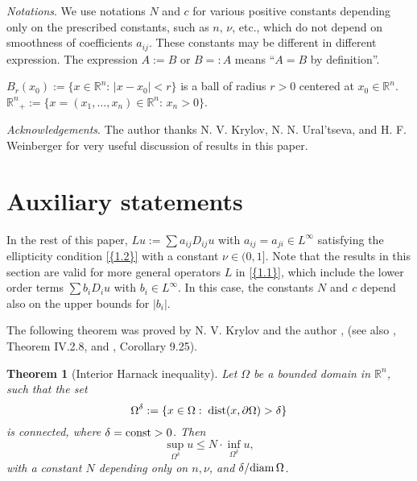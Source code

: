 \documentclass[regno,12pt]{amsart}
\newtheorem{theorem}{Theorem}[section]
\theoremstyle{definition}
\theoremstyle{remark}
\begin{document}
\emph{Notations}.  We use notations $N$ and $c$ for various positive constants depending only on the prescribed constants, such as $n,\,\nu$, etc., which do not depend on smoothness of coefficients $a_{ij}$. These constants may be different in different expression.
The expression $A:=B$ or $B=:A$ means ``$A=B$ by definition''.

$B_r(x_0):=\{x\in{{\mathbb R}^n}:\,|x-x_0|<r\}$ is a ball of radius $r>0$ centered at $x_0\in{{\mathbb R}^n}$. ${{\mathbb R}^n}_+:=\{x=(x_1,\ldots,x_n)\in{{\mathbb R}^n}:\,x_n>0\}$.
\medskip

\emph{Acknowledgements}. The author thanks N. V. Krylov, N. N. Ural'tseva, and H. F. Weinberger for very useful discussion of results in this paper.

{\section{{Auxiliary statements}}
\setcounter{equation}{0}}\label{S.2}

In the rest of this paper, $Lu:=\sum a_{ij}D_{ij}u$ with $a_{ij}=a_{ji}\in L^{\infty}$ satisfying the ellipticity condition {\eqref{{1.2}}} with a constant $\nu\in (0,1]$. Note that the results in this section are valid for more general operators $L$ in {\eqref{{1.1}}}, which include the lower order terms $\sum b_iD_iu$ with $b_i\in L^{\infty}$. In this case, the constants $N$ and $c$ depend also on the upper bounds for $|b_i|$.

The following theorem was proved by N. V. Krylov and the author \cite{KS80}, \cite{S80} (see also \cite{K}, Theorem IV.2.8, and \cite{GT}, Corollary 9.25).

\begin{theorem}[Interior Harnack inequality]\label{T2.1}
    Let $\Omega$ be a bounded domain in ${{\mathbb R}^n}$, such that the set
    \begin{equation}\label{2.1}
        \Omega^{\delta}:=\{x\in\Omega:\;{{\rm dist}}(x,{\partial\Omega})>\delta\}
    \end{equation}
is connected, where $\delta={{\rm const}}>0$. Then
    \begin{equation}\label{2.2}
        \sup_{\Omega^{\delta}}u\le N\cdot \inf_{\Omega^{\delta}}u,
    \end{equation}
    with a constant $N$ depending only on $n,\nu$, and $\delta/{{\rm diam}\,} \Omega$.
\end{theorem}
\end{document}
